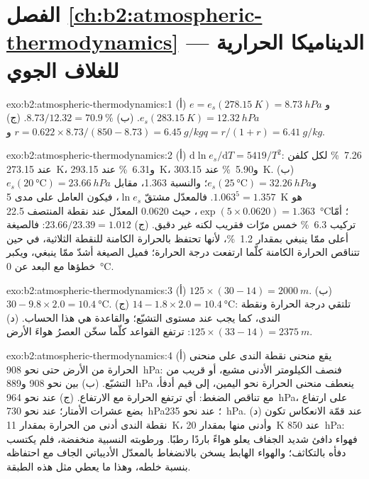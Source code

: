 \section*{الفصل \ref{ch:b2:atmospheric-thermodynamics} --- الديناميكا الحرارية للغلاف الجوي}

\begin{solution}{exo:b2:atmospheric-thermodynamics:1}
(أ) $e = e_s(\qty{278.15}{K}) = \qty{8.73}{hPa}$ و$e_s(\qty{283.15}{K}) = \qty{12.32}{hPa}$.
(ب) $8.73/12.32 = \qty{70.9}{\percent}$. (ج) $r = 0.622 \times 8.73/(850 - 8.73) =
\qty{6.45}{g/kg}$ و$q = r/(1 + r) = \qty{6.41}{g/kg}$.
\end{solution}

\begin{solution}{exo:b2:atmospheric-thermodynamics:2}
(أ) $\mathrm{d}\ln e_s/\mathrm{d}T = 5419/T^2$: \qty{7.26}{\percent} لكل كلفن عند
\qty{273.15}{K}، و\qty{6.31}{\percent} عند \qty{293.15}{K}، و\qty{5.90}{\percent} عند
\qty{303.15}{K}. (ب) $e_s(\qty{20}{\celsius}) = \qty{23.66}{hPa}$ و$e_s(\qty{25}{\celsius})
= \qty{32.26}{hPa}$؛ والنسبة 1.363، مقابل $1.063^5 = 1.357$. فالمعدّل مشتقّ
$\ln e_s$، فيكون العامل على مدى \qty{5}{K} هو $\exp(5 \times 0.0620) = 1.363$، حيث 0.0620
المعدّل عند نقطة المنتصف \qty{22.5}{\celsius}؛ أمّا تركيب \qty{6.3}{\percent} خمس مرّات فقريب
لكنه غير دقيق. (ج) $23.66/23.39 = 1.012$: فالصيغة أعلى ممّا ينبغي بمقدار \qty{1.2}{\percent}، لأنها
تحتفظ بالحرارة الكامنة للنقطة الثلاثية، في حين تتناقص الحرارة الكامنة كلّما ارتفعت درجة
الحرارة؛ فميل الصيغة أشدّ ممّا ينبغي، ويكبر خطؤها مع البعد عن
\qty{0}{\celsius}.
\end{solution}

\begin{solution}{exo:b2:atmospheric-thermodynamics:3}
(أ) $125 \times (30 - 14) = \qty{2000}{m}$. (ب) $30 - 9.8 \times 2.0 = \qty{10.4}{\celsius}$.
(ج) $14 - 1.8 \times 2.0 = \qty{10.4}{\celsius}$: تلتقي درجة الحرارة ونقطة الندى، كما يجب عند
مستوى التشبّع؛ والقاعدة هي هذا الحساب. (د) $125 \times (33 - 14) = \qty{2375}{m}$:
ترتفع القواعد كلّما سخّن العصرُ هواءَ الأرض.
\end{solution}

\begin{solution}{exo:b2:atmospheric-thermodynamics:4}
(أ) يقع منحنى نقطة الندى على منحنى الحرارة من الأرض حتى نحو \qty{908}{hPa}:
فنصف الكيلومتر الأدنى مشبع، أو قريب من التشبّع. (ب) بين نحو 908 و\qty{889}{hPa}
ينعطف منحنى الحرارة نحو اليمين، إلى قيم أدفأ، مع تناقص الضغط: أي
ترتفع الحرارة مع الارتفاع. (ج)  عند نحو \qty{964}{hPa}، على ارتفاع بضع عشرات الأمتار؛  عند
نحو \qty{730}{hPa}؛  عند نحو \qty{235}{hPa}. (د) عند قمّة الانعكاس تكون نقطة الندى
أدنى من الحرارة بمقدار \qty{11}{K}، وأدنى منها بمقدار \qty{20}{K} عند \qty{850}{hPa}: فهواء دافئ شديد الجفاف
يعلو هواءً باردًا رطبًا. ورطوبته النسبية منخفضة، فلم يكتسب
دفأه بالتكاثف؛ والهواء الهابط يسخن بالانضغاط بالمعدّل الأديباتي الجاف مع
احتفاظه بنسبة خلطه، وهذا ما يعطي مثل هذه الطبقة.
\end{solution}


